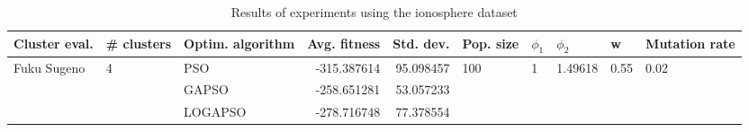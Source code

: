 \begin{table}
\centering
\caption{Results of experiments using the ionosphere dataset}
\begin{tabular}{lllrrlllll}
\toprule
               Cluster eval. &        \# clusters & Optim. algorithm &  Avg. fitness &  Std. dev. &            Pop. size &         $\phi_{1}$ &               $\phi_{2}$ &                     w &         Mutation rate \\
\midrule
\multirow{3}{*}{Fuku Sugeno} & \multirow{3}{*}{4} &              PSO &   -315.387614 &  95.098457 & \multirow{3}{*}{100} & \multirow{3}{*}{1} & \multirow{3}{*}{1.49618} & \multirow{3}{*}{0.55} & \multirow{3}{*}{0.02} \\
                             &                    &            GAPSO &   -258.651281 &  53.057233 &                      &                    &                          &                       &                       \\
                             &                    &          LOGAPSO &   -278.716748 &  77.378554 &                      &                    &                          &                       &                       \\
\bottomrule
\end{tabular}
\end{table}
